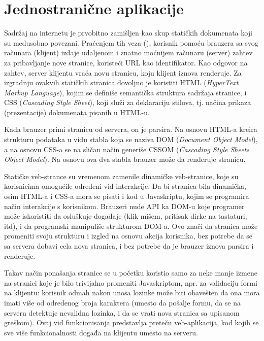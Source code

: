 \section{Jednostranične aplikacije}

Sadržaj na internetu je prvobitno zamišljen kao skup statičkih dokumenata koji su međusobno povezani.
Praćenjem tih veza (), korisnik pomoću brauzera sa svog računara (klijent) izdaje udaljenom i znatno moćnijem računaru (server) zahtev za pribavljanje nove stranice, koristeći URL kao identifikator.
Kao odgovor na zahtev, server klijentu vraća novu stranicu, koju klijent iznova renderuje.
Za izgradnju ovakvih statičkih stranica dovoljno je koristiti HTML (\textsl{HyperText Markup Language}), kojim se definiše semantička struktura sadržaja stranice, i CSS (\textsl{Cascading Style Sheet}), koji služi za deklaraciju stilova, tj. načina prikaza (prezentacije) dokumenata pisanih u HTML-u.

Kada brauzer primi stranicu od servera, on je parsira.
Na osnovu HTML-a kreira strukturu podataka u vidu stabla koja se naziva DOM (\textsl{Document Object Model}), a na osnovu CSS-a se na sličan način generiše CSSOM (\textsl{Cascading Style Sheets Object Model}).
Na osnovu ova dva stabla brauzer može da renderuje stranicu.

Statičke veb-strance su vremenom zamenile dinamičke veb-stranice, koje su korisnicima omogućile odredeni vid interakcije.
Da bi stranica bila dinamička, osim HTML-a i CSS-a mora se pisati i kod u Javaskriptu, kojim se programira način interakcije s korisnikom.
Brauzeri nude API ka DOM-u koje programer može iskoristiti da osluškuje dogadaje (klik mišem, pritisak dirke na tastaturi, itd), i da programski manipuliše strukturom DOM-a.
Ovo znači da stranica može promeniti svoju strukturu i izgled na osnovu akcija korisnika, bez potrebe da se sa servera dobavi cela nova stranica, i bez potrebe da je brauzer iznova parsira i renderuje.

Takav način ponašanja stranice se u početku koristio samo za neke manje izmene na stranici koje je bilo trivijalno promeniti Javaskriptom, npr. za validaciju formi na klijentu: korisnik odmah nakon unosa lozinke može biti obavešten da ona mora imati više od odredenog broja karaktera (umesto da pošalje formu, da se na serveru detektuje nevalidna lozinka, i da se vrati nova stranica sa upisanom greškom).
Ovaj vid funkcionisanja predstavlja preteču veb-aplikacija, kod kojih se sve više funkcionalnosti događa na klijentu umesto na serveru.

